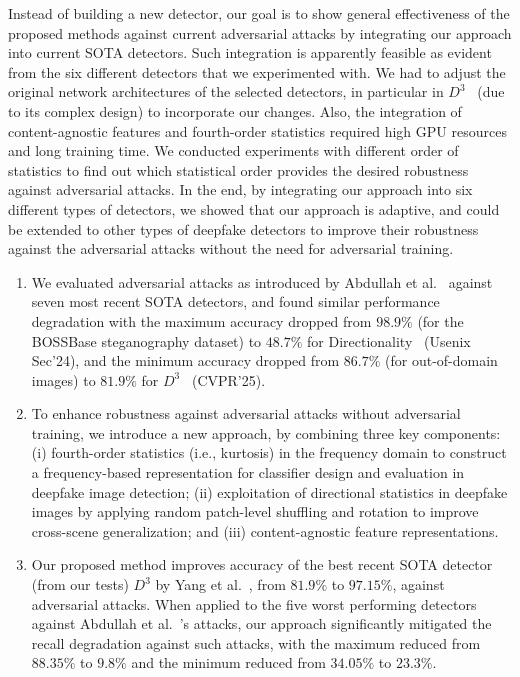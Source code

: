 \documentclass[letterpaper,twocolumn,10pt]{article}
\newcommand{\subhead}[1]{\vspace{1pt}\noindent{\textbf{#1.}}}
\begin{document}
Instead of building a new detector, our goal is to show general effectiveness of the proposed methods against current adversarial attacks by integrating our approach into current SOTA detectors. Such integration is apparently feasible as evident from the six different detectors that we experimented with. We had to adjust the original network architectures of the selected detectors, in particular in $D^{3}$~\cite{yang2025d3} (due to its complex design) to incorporate our changes. Also, the integration of content-agnostic features and fourth-order statistics required high GPU resources and long training time. We conducted experiments with different order of statistics to find out which statistical order provides the desired robustness against adversarial attacks. In the end, by integrating our approach into six different types of detectors, we showed that our approach is adaptive, and could be extended to other types of deepfake detectors to improve their robustness against the adversarial attacks without the need for adversarial training.

\subhead{Main contributions}
\begin{enumerate}
\item We evaluated adversarial attacks as introduced by Abdullah et al.~\cite{Sifat2024evolvingthreat} against seven most recent SOTA detectors,  and found similar performance degradation with the maximum accuracy dropped from $98.9\%$ (for the BOSSBase steganography dataset) to $48.7\%$ for Directionality~\cite{Lorch2024landscape} (Usenix Sec'24), 
and the minimum accuracy dropped from $86.7\%$ (for out-of-domain images)
to $81.9\%$ for $D^3$~\cite{yang2025d3} (CVPR'25).

\item To enhance robustness against adversarial attacks without adversarial training, we introduce a new approach, by combining three key components: 
(i) fourth-order statistics (i.e., kurtosis) in the frequency domain to construct a frequency-based representation for classifier design and evaluation in deepfake image detection;
(ii) exploitation of directional statistics in deepfake images by applying random patch-level shuffling and rotation to improve cross-scene generalization; and
(iii) content-agnostic feature representations.
\item Our proposed method improves accuracy of the best recent SOTA detector (from our tests) $D^3$ by Yang et al.~\cite{yang2025d3}, from $81.9\%$ to $97.15\%$,  against adversarial attacks. 
When applied to the five worst performing detectors against Abdullah et al.~\cite{Sifat2024evolvingthreat}'s attacks, our approach significantly mitigated the recall degradation against such attacks, with the maximum reduced from $88.35\%$ to $9.8\%$  and the minimum reduced from $34.05\%$ to $23.3\%$. 
\end{enumerate}
\end{document}
